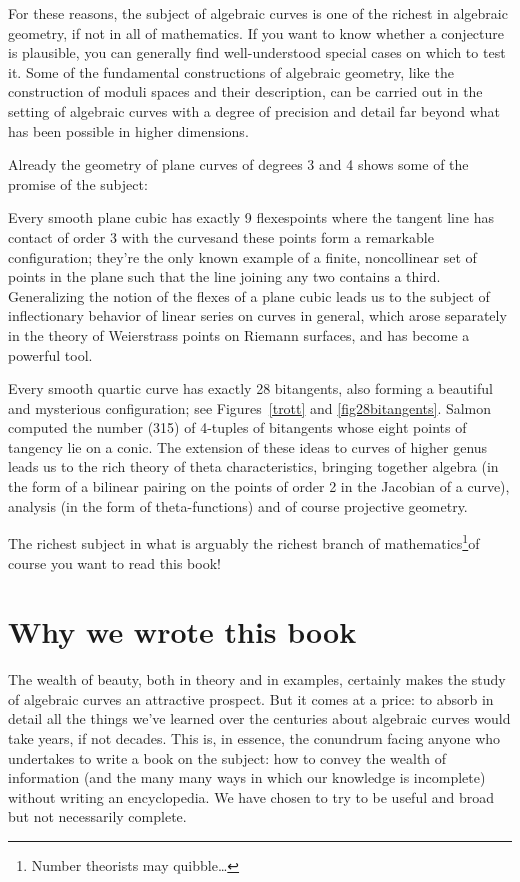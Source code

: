 For these reasons, the subject of algebraic curves is one of the richest in algebraic geometry, if not in all of mathematics. If you want to know whether a conjecture is plausible, you can generally find well-understood special cases on which to test it. Some of the fundamental constructions of algebraic geometry, like the construction of moduli spaces and their description, can be carried out in the setting of algebraic curves with a degree of precision and detail far beyond what has been possible in higher dimensions. 

Already the geometry of plane curves of degrees 3 and 4 shows some of the promise of the subject:

Every smooth plane cubic has exactly 9 flexes\emdash points where the
%
tangent line has contact of order 3 with the curves\emdash and these
points form a remarkable configuration; they're the only known example
of a finite, noncollinear set of points in the plane such that the line
joining any two contains a third. Generalizing the notion of the
flexes of a plane cubic leads us to the subject of inflectionary
behavior of linear series on curves in general, which arose separately
in the theory of Weierstrass points on Riemann surfaces, and  has
become a powerful tool.

Every smooth quartic curve has exactly 28 bitangents, also forming a beautiful and mysterious configuration; see 
%
%
Figures~\ref{trott} and \ref{fig28bitangents}. 
Salmon
\citeyear[p.\,197]{Salmon1852}
computed the number (315) of 4-tuples of bitangents whose eight points
of tangency lie on a conic. The extension of these ideas to curves of
higher genus leads us to the rich theory of theta characteristics,
bringing together algebra (in the form of a bilinear pairing on the
points of order 2 in the Jacobian of a curve), analysis (in the form
of theta-functions) and of course projective geometry.

The richest subject in what is arguably the richest branch of
mathematics\footnote{Number theorists may quibble\dots}\emdash of
%
course you want to read this book!  

\section*{Why we wrote this book}

The wealth of beauty, both in theory and in examples, certainly makes the study of algebraic curves an attractive prospect. But it comes at a price: to absorb in detail all the things we've learned over the centuries about algebraic curves would take years, if not decades. This is, in essence, the conundrum facing anyone who undertakes to write a book on the subject: how to convey the wealth of information  (and the many many ways in which our knowledge is incomplete) without writing an encyclopedia. We have chosen to try to be useful and broad but not necessarily complete. 


